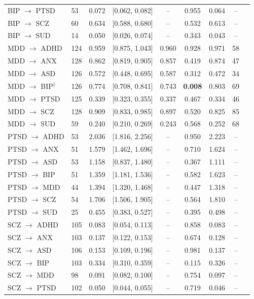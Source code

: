 \documentclass[11pt]{article}
\begin{document}
\begin{table}[h]
\begin{tabular}{llccccccc}
BIP $\to$ PTSD & 53 & 0.072 & [0.062, 0.082] & -- & 0.955 & 0.064 & -- \\
BIP $\to$ SCZ & 60 & 0.634 & [0.588, 0.680] & -- & 0.532 & 0.613 & -- \\
BIP $\to$ SUD & 14 & 0.050 & [0.026, 0.074] & -- & 0.343 & 0.043 & -- \\
\midrule
MDD $\to$ ADHD & 124 & 0.959 & [0.875, 1.043] & 0.960 & 0.928 & 0.971 & 58 \\
MDD $\to$ ANX & 128 & 0.862 & [0.819, 0.905] & 0.857 & 0.419 & 0.874 & 47 \\
MDD $\to$ ASD & 126 & 0.572 & [0.448, 0.695] & 0.587 & 0.312 & 0.472 & 34 \\
MDD $\to$ BIP$^{\dagger}$ & 126 & 0.774 & [0.708, 0.841] & 0.743 & \textbf{0.008} & 0.803 & 69 \\
MDD $\to$ PTSD & 125 & 0.339 & [0.323, 0.355] & 0.337 & 0.467 & 0.334 & 46 \\
MDD $\to$ SCZ & 128 & 0.909 & [0.833, 0.985] & 0.897 & 0.520 & 0.825 & 85 \\
MDD $\to$ SUD & 59 & 0.240 & [0.210, 0.269] & 0.243 & 0.568 & 0.252 & 68 \\
\midrule
PTSD $\to$ ADHD & 53 & 2.036 & [1.816, 2.256] & -- & 0.950 & 2.223 & -- \\
PTSD $\to$ ANX & 51 & 1.579 & [1.462, 1.696] & -- & 0.710 & 1.624 & -- \\
PTSD $\to$ ASD & 53 & 1.158 & [0.837, 1.480] & -- & 0.367 & 1.111 & -- \\
PTSD $\to$ BIP & 51 & 1.359 & [1.181, 1.536] & -- & 0.582 & 1.623 & -- \\
PTSD $\to$ MDD & 44 & 1.394 & [1.320, 1.468] & -- & 0.447 & 1.318 & -- \\
PTSD $\to$ SCZ & 54 & 1.706 & [1.506, 1.905] & -- & 0.564 & 1.810 & -- \\
PTSD $\to$ SUD & 25 & 0.455 & [0.383, 0.527] & -- & 0.395 & 0.498 & -- \\
\midrule
SCZ $\to$ ADHD & 105 & 0.083 & [0.054, 0.113] & -- & 0.858 & 0.083 & -- \\
SCZ $\to$ ANX & 103 & 0.137 & [0.122, 0.153] & -- & 0.674 & 0.128 & -- \\
SCZ $\to$ ASD & 106 & 0.153 & [0.109, 0.196] & -- & 0.981 & 0.137 & -- \\
SCZ $\to$ BIP & 103 & 0.334 & [0.310, 0.359] & -- & 0.115 & 0.326 & -- \\
SCZ $\to$ MDD & 98 & 0.091 & [0.082, 0.100] & -- & 0.754 & 0.097 & -- \\
SCZ $\to$ PTSD & 102 & 0.050 & [0.044, 0.055] & -- & 0.719 & 0.046 & -- \\

\end{tabular}
\end{table}
\end{document}
